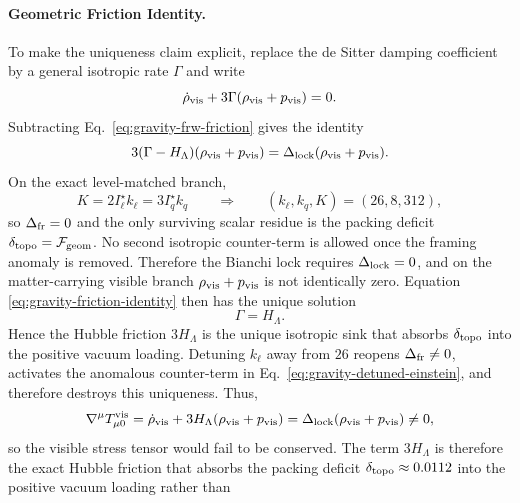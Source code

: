 \documentclass[11pt]{article}
\begin{document}
\paragraph{Geometric Friction Identity.}
To make the uniqueness claim explicit, replace the de Sitter damping coefficient
by a general isotropic rate $\Gamma$ and write
\begin{equation}
\label{eq:gravity-general-friction}
 \dot\rho_{\rm vis}+3\Gamma(\rho_{\rm vis}+p_{\rm vis})=0.
\end{equation}
Subtracting Eq.~\eqref{eq:gravity-frw-friction} gives the identity
\begin{equation}
\label{eq:gravity-friction-identity}
 3(\Gamma-H_{\Lambda})(\rho_{\rm vis}+p_{\rm vis})
 =
 \Delta_{\rm lock}(\rho_{\rm vis}+p_{\rm vis}).
\end{equation}
On the exact level-matched branch,
\begin{equation}
\label{eq:gravity-level-matching-local}
 K=2I_{\ell}^{\star}k_{\ell}=3I_q^{\star}k_q
 \qquad\Longrightarrow\qquad
 (k_{\ell},k_q,K)=(26,8,312),
\end{equation}
so $\Delta_{\rm fr}=0$ and the only surviving scalar residue is the packing
deficit $\delta_{\rm topo}=\mathcal F_{\rm geom}$. No second isotropic
counter-term is allowed once the framing anomaly is removed. Therefore the
Bianchi lock requires $\Delta_{\rm lock}=0$, and on the matter-carrying visible
branch $\rho_{\rm vis}+p_{\rm vis}$ is not identically zero. Equation
\eqref{eq:gravity-friction-identity} then has the unique solution
\begin{equation}
\label{eq:gravity-unique-friction}
 \Gamma=H_{\Lambda}.
\end{equation}
Hence the Hubble friction $3H_{\Lambda}$ is the unique isotropic sink that
absorbs $\delta_{\rm topo}$ into the positive vacuum loading. Detuning
$k_{\ell}$ away from $26$ reopens $\Delta_{\rm fr}\neq0$, activates the
anomalous counter-term in Eq.~\eqref{eq:gravity-detuned-einstein}, and
therefore destroys this uniqueness.
Thus,
\begin{equation}
\label{eq:gravity-visible-stress-mismatch}
 \nabla^{\mu}T^{\rm vis}_{\mu 0}
 =
 \dot\rho_{\rm vis}+3H_{\Lambda}(\rho_{\rm vis}+p_{\rm vis})
 =
 \Delta_{\rm lock}(\rho_{\rm vis}+p_{\rm vis})
 \neq 0,
\end{equation}
so the visible stress tensor would fail to be conserved. The term $3H_{\Lambda}$
is therefore the exact Hubble friction that absorbs the packing deficit
$\delta_{\rm topo}\approx0.0112$ into the positive vacuum loading rather than
\end{document}
